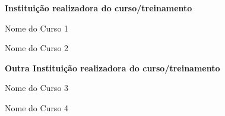 

\begin{cventries}

  \cventry
    {\textbf{Instituição realizadora do curso/treinamento}}{}{}{}
    {
      \begin{cvitems} 
       \item {Nome do Curso 1}
       \item {Nome do Curso 2}
      \end{cvitems}
    }

\cventry
{\textbf{Outra Instituição realizadora do curso/treinamento}}{}{}{}
{
	\begin{cvitems} 
		\item {Nome do Curso 3}
		\item {Nome do Curso 4}
	\end{cvitems}
}



\end{cventries}
